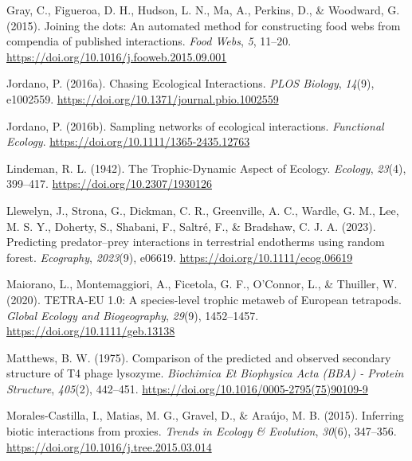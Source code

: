 \documentclass[
]{article}
\newlength{\cslhangindent}
\newenvironment{CSLReferences}[2] %
 {\begin{list}{}{%
  \setlength{\itemindent}{0pt}
  \setlength{\leftmargin}{0pt}
  \setlength{\parsep}{0pt}
  \ifodd #1
   \setlength{\leftmargin}{\cslhangindent}
   \setlength{\itemindent}{-1\cslhangindent}
  \fi
  \setlength{\itemsep}{#2\baselineskip}}}
 {\end{list}}
\begin{document}
\begin{CSLReferences}{1}{0}
Gray, C., Figueroa, D. H., Hudson, L. N., Ma, A., Perkins, D., \&
Woodward, G. (2015). Joining the dots: {An} automated method for
constructing food webs from compendia of published interactions.
\emph{Food Webs}, \emph{5}, 11--20.
\url{https://doi.org/10.1016/j.fooweb.2015.09.001}

Jordano, P. (2016a). Chasing {Ecological Interactions}. \emph{PLOS
Biology}, \emph{14}(9), e1002559.
\url{https://doi.org/10.1371/journal.pbio.1002559}

Jordano, P. (2016b). Sampling networks of ecological interactions.
\emph{Functional Ecology}. \url{https://doi.org/10.1111/1365-2435.12763}

Lindeman, R. L. (1942). The {Trophic-Dynamic Aspect} of {Ecology}.
\emph{Ecology}, \emph{23}(4), 399--417.
\url{https://doi.org/10.2307/1930126}

Llewelyn, J., Strona, G., Dickman, C. R., Greenville, A. C., Wardle, G.
M., Lee, M. S. Y., Doherty, S., Shabani, F., Saltré, F., \& Bradshaw, C.
J. A. (2023). Predicting predator--prey interactions in terrestrial
endotherms using random forest. \emph{Ecography}, \emph{2023}(9),
e06619. \url{https://doi.org/10.1111/ecog.06619}

Maiorano, L., Montemaggiori, A., Ficetola, G. F., O'Connor, L., \&
Thuiller, W. (2020). {TETRA-EU} 1.0: {A} species-level trophic metaweb
of {European} tetrapods. \emph{Global Ecology and Biogeography},
\emph{29}(9), 1452--1457. \url{https://doi.org/10.1111/geb.13138}

Matthews, B. W. (1975). Comparison of the predicted and observed
secondary structure of {T4} phage lysozyme. \emph{Biochimica Et
Biophysica Acta (BBA) - Protein Structure}, \emph{405}(2), 442--451.
\url{https://doi.org/10.1016/0005-2795(75)90109-9}

Morales-Castilla, I., Matias, M. G., Gravel, D., \& Araújo, M. B.
(2015). Inferring biotic interactions from proxies. \emph{Trends in
Ecology \& Evolution}, \emph{30}(6), 347--356.
\url{https://doi.org/10.1016/j.tree.2015.03.014}


\end{CSLReferences}
\end{document}
